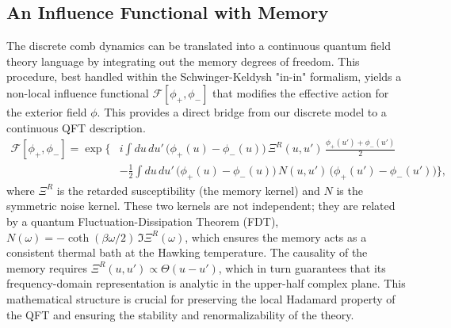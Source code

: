 \documentclass[aps,prd,preprint,onecolumn,superscriptaddress,nofootinbib,longbibliography,floatfix,11pt,showpacs,showkeys]{revtex4-2}
\theoremstyle{plain}
\theoremstyle{definition}
\theoremstyle{remark}
\begin{document}

\subsection{An Influence Functional with Memory}
\label{sec:influence}
The discrete comb dynamics can be translated into a continuous quantum field theory language by integrating out the memory degrees of freedom. This procedure, best handled within the Schwinger-Keldysh "in-in" formalism, yields a non-local influence functional $\mathcal{F}[\phi_+, \phi_-]$ that modifies the effective action for the exterior field $\phi$. This provides a direct bridge from our discrete model to a continuous QFT description.
\begin{align}
    \mathcal{F}[\phi_+, \phi_-]=\exp\Bigg\{ & i\!\int \!du\,du'\,\big(\phi_+(u)-\phi_-(u)\big)\,\Xi^R(u, u')\,\frac{\phi_+(u')+\phi_-(u')}{2} \nonumber \\
    & - \frac{1}{2}\!\int \!du\,du'\,\big(\phi_+(u)-\phi_-(u)\big)\,N(u,u')\,\big(\phi_+(u')-\phi_-(u')\big) \Bigg\},
    \label{eq:influence_functional}
\end{align}
where $\Xi^R$ is the retarded susceptibility (the memory kernel) and $N$ is the symmetric noise kernel. These two kernels are not independent; they are related by a quantum Fluctuation-Dissipation Theorem (FDT), $N(\omega)= - \coth(\beta \omega/2)\,\Im \Xi^R(\omega)$, which ensures the memory acts as a consistent thermal bath at the Hawking temperature. The causality of the memory requires $\Xi^R(u,u') \propto \Theta(u-u')$, which in turn guarantees that its frequency-domain representation is analytic in the upper-half complex plane. This mathematical structure is crucial for preserving the local Hadamard property of the QFT and ensuring the stability and renormalizability of the theory.
\end{document}
